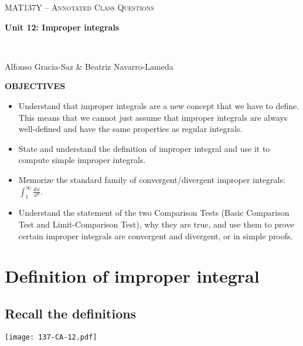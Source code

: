 \documentclass[11pt]{article}
\newcommand {\DS} [1] {${\displaystyle #1}$}
\begin{document}
\thispagestyle{empty}
	\begin{center}
		{ {\LARGE  \scshape
		\textcolor{137cp3}{MAT137Y --   Annotated Class Questions}
		}
		
		\medskip
		{\bf \Large \textcolor{137cp1}{Unit 12: Improper integrals
		}}
		
		\
		
		\medskip
		{\large
		\textcolor{137cp1}{Alfonso Gracia-Saz \& Beatriz Navarro-Lameda}
		}}
	\end{center}


{\bf OBJECTIVES}

\vspace{3mm}

	\begin{itemize}
		\item Understand that improper integrals are a new concept that we have to define.  This means that we cannot just assume that improper integrals are always well-defined and have the same properties as regular integrals.
		
		\item State and understand the definition of improper integral and use it to compute simple improper integrals.
		
		\item Memorize the standard family of convergent/divergent improper integrals: \DS{\int^{\infty}_1 \frac{dx}{x^p}}.

		\item Understand the statement of the two Comparison Tests (Basic Comparison Test and Limit-Comparison Test), why they are true, and use them to prove certain improper integrals are convergent and divergent, or in simple proofs.		
	\end{itemize}

\vspace{3mm}

\tableofcontents

\newpage

\section{Definition of improper integral}
\subsection{Recall the definitions}

\begin{center}
{ \texttt{[image: 137-CA-12.pdf]}} 
\end{center}
\end{document}
